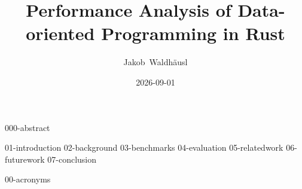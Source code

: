 \documentclass[a4paper,oneside,12pt,ngerman,english]{scrbook} %
\begin{document}
\frontmatter

\title{Performance Analysis of Data-oriented Programming in Rust}
\author{ Jakob~Waldhäusl }
\date{2026-09-01}

\maketitle


{000-abstract}

\cleardoubleoddpage
\tableofcontents


\mainmatter

{01-introduction}
{02-background}
{03-benchmarks}
{04-evaluation}
{05-relatedwork}
{06-futurework}
{07-conclusion}


\cleardoubleoddpage
\printbibliography

\cleardoubleoddpage
\lstlistoflistings

\cleardoubleoddpage
\listoffigures

\cleardoubleoddpage
\listoftables

\cleardoubleoddpage
{00-acronyms}


\cleardoubleoddpage
\end{document}
